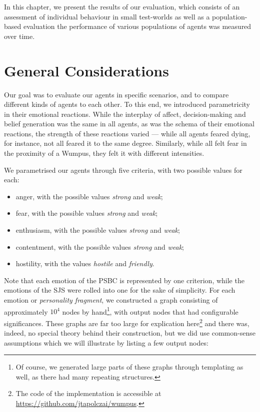 In this chapter, we present the results of our evaluation, which consists of an assessment of individual behaviour in small test-worlds as well as a population-based evaluation the performance of various populations of agents was measured over time.

\section{General Considerations}\label{sec:results}

Our goal was to evaluate our agents in specific scenarios, and to compare different kinds of agents to each other. To this end, we introduced parametricity in their emotional reactions. While the interplay of affect, decision-making and belief generation was the same in all agents, as was the schema of their emotional reactions, the strength of these reactions varied --- while all agents feared dying, for instance, not all feared it to the same degree. Similarly, while all felt fear in the proximity of a Wumpus, they felt it with different intensities.

We parametrised our agents through five criteria, with two possible values for each:

\begin{itemize}
	\item anger, with the possible values \emph{strong} and \emph{weak};
	\item fear, with the possible values \emph{strong} and \emph{weak};
	\item enthusiasm, with the possible values \emph{strong} and \emph{weak};
	\item contentment, with the possible values \emph{strong} and \emph{weak};
	\item hostility, with the values \emph{hostile} and \emph{friendly}.
\end{itemize}

Note that each emotion of the PSBC is represented by one criterion, while the emotions of the SJS were rolled into one for the sake of simplicity. For each emotion or \emph{personality fragment}, we constructed a graph consisting of approximately $10^4$ nodes by hand\footnote{Of course, we generated large parts of these graphs through templating as well, as there had many repeating structures.}, with output nodes that had configurable significances. These graphs are far too large for explication here\footnote{The code of the implementation is accessible at \url{https://github.com/jtapolczai/wumpus}.} and there was, indeed, no special theory behind their construction, but we did use common-sense assumptions which we will illustrate by listing a few output nodes:

